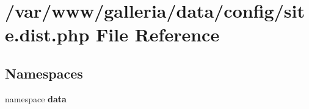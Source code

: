 \section{/var/www/galleria/data/config/site.dist.php File Reference}
\label{site_8dist_8php}
\subsection*{Namespaces}
\begin{CompactItemize}
\item 
namespace {\bf data}
\end{CompactItemize}

